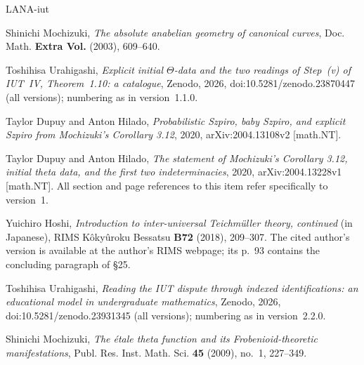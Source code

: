 \documentclass[11pt]{amsart}
\theoremstyle{remark}
\begin{document}
\providecommand{\bysame}{\leavevmode\hbox to3em{\hrulefill}\thinspace}
\providecommand{\MR}{\relax\ifhmode\unskip\space\fi MR }
\providecommand{\MRhref}[2]{%
  \href{http://www.ams.org/mathscinet-getitem?mr=#1}{#2}
}
\providecommand{\href}[2]{#2}
\begin{thebibliography}{LANA-iut}

Shinichi Mochizuki, \emph{The absolute anabelian geometry of canonical curves},
  Doc. Math. \textbf{Extra Vol.} (2003), 609--640.

Toshihisa Urahigashi, \emph{Explicit initial $\Theta$-data and the two readings of Step~(v) of {IUT}~{IV},
  Theorem~1.10: a catalogue}, Zenodo, 2026,
  \href{https://doi.org/10.5281/zenodo.23870447}{doi:10.5281/zenodo.23870447} (all versions); numbering as in
  version~1.1.0.

Taylor Dupuy and Anton Hilado, \emph{Probabilistic {S}zpiro, baby {S}zpiro, and
  explicit {S}zpiro from {M}ochizuki's {C}orollary 3.12}, 2020,
  arXiv:2004.13108v2 [math.NT].

Taylor Dupuy and Anton Hilado, \emph{The statement of {M}ochizuki's {C}orollary 3.12,
  initial theta data, and the first two indeterminacies}, 2020,
  \href{https://arxiv.org/abs/2004.13228v1}{arXiv:2004.13228v1} [math.NT].
  All section and page references to this item refer specifically to version~1.

Yuichiro Hoshi, \emph{Introduction to inter-universal {T}eichm\"uller theory, continued}
  (in Japanese), RIMS K\^oky\^uroku Bessatsu \textbf{B72} (2018), 209--307.
  The cited author's version is available at
  \href{https://www.kurims.kyoto-u.ac.jp/~yuichiro/introduction_to_inter-universal_teichmuller_theory_continued.pdf}{the author's RIMS webpage};
  its p.~93 contains the concluding paragraph of \S25.

Toshihisa Urahigashi, \emph{Reading the {IUT} dispute through indexed identifications: an educational model in
  undergraduate mathematics}, Zenodo, 2026,
  \href{https://doi.org/10.5281/zenodo.23931345}{doi:10.5281/zenodo.23931345} (all versions); numbering as in
  version~2.2.0.

Shinichi Mochizuki, \emph{The \'etale theta function and its
  {F}robenioid-theoretic manifestations}, Publ. Res. Inst. Math. Sci.
  \textbf{45} (2009), no.~1, 227--349.


\end{thebibliography}
\end{document}
